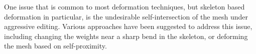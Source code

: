 One issue that is common to most deformation techniques, but skeleton based deformation in particular, is the undesirable self-intersection of the mesh under aggressive editing. Various approaches have been suggested to address this issue, including changing the weights near a sharp bend in the skeleton\cite{Lewis00}, or deforming the mesh based on self-proximity\cite{Yoshizawa07}.








